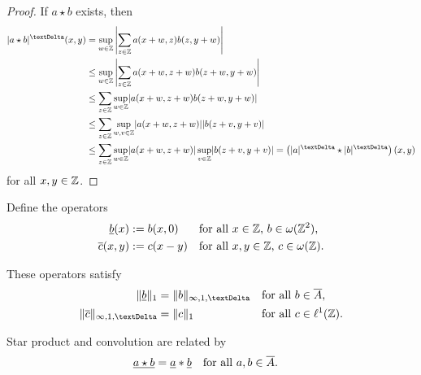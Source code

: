 \begin{proof}
    If $ a \star b $ exists, then
    \begin{align*}
        \absDi{ a \star b }( x, y )
        &=
        \sup_{w\in\nrZ} \Abs{ \sum_{z\in\nrZ} a(x+w,z)b(z,y+w) }
        \\
        &\leq
        \sup_{w\in\nrZ} \Abs{ \sum_{z\in\nrZ} a(x+w,z+w)b(z+w,y+w) }
        \\
        &\leq
        \sum_{z\in\nrZ} \sup_{w\in\nrZ} \abs{ a(x+w,z+w)b(z+w,y+w) }
        \\
        &\leq
        \sum_{z\in\nrZ} \sup_{w,v\in\nrZ}\abs{ a(x+w,z+w) }\abs{ b(z+v,y+v) }
        \\
        &\leq
        \sum_{z\in\nrZ} \sup_{w\in\nrZ}\abs{ a(x+w,z+w) }
        \sup_{v\in\nrZ}\abs{ b(z+v,y+v) }
        =
        \left( \absDi{ a } \star \absDi{ b } \right)( x, y )
    \end{align*}
    for all $ x, y \in \mathbb{ Z } $.
\end{proof}

Define the operators
\begin{align}
    \underline{b}( x )
    &:=
    b( x, 0 )
    &&\text{for all $ x \in \mathbb{ Z } $, $ b \in \omega( \mathbb{ Z }^2 ) $,}
    \\
    \overline{c}( x, y )
    &:=
    c( x - y )
    &&\text{for all $ x, y \in \mathbb{ Z } $, $ c \in \omega( \mathbb{ Z } ) $.}
\end{align}

\begin{lemma}
    These operators satisfy
    \begin{align}
        \norm{ \underline{b} }_1
        &=
        \norm{ b }_{\infi,1,\tDe}
        &&\text{for all $ b \in \overline{A} $,}
        \\
        \norm{ \overline{c} }_{\infi,1,\tDe}
        &=
        \norm{ c }_1
        &&\text{for all $ c \in \fsSum{1}(\nrZ) $.}
    \end{align}
\end{lemma}

\begin{lemma}
    Star product and convolution are related by
    \begin{align*}
        \underline{ a \star b }
        &=
        \underline{ a } \mathbin{*} \underline{ b }
        &&\text{for all $ a, b \in \overline{A} $.}
    \end{align*}
\end{lemma}


